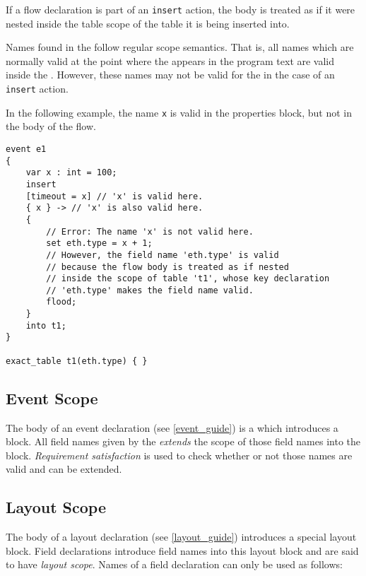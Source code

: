 If a flow declaration is part of an \texttt{insert} action, the body is treated as if it were nested inside the table scope of the table it is being inserted into.

Names found in the  follow regular scope semantics. That is, all names which are normally valid at the point where the  appears in the program text are valid inside the . However, these names may not be valid for the  in the case of an \texttt{insert} action.

In the following example, the name \texttt{x} is valid in the properties block, but not in the body of the flow.

\begin{minip}
\begin{lstlisting}
event e1
{
	var x : int = 100;
	insert
	[timeout = x] // 'x' is valid here.
	{ x } -> // 'x' is also valid here.
	{
		// Error: The name 'x' is not valid here.
		set eth.type = x + 1;
		// However, the field name 'eth.type' is valid
		// because the flow body is treated as if nested
		// inside the scope of table 't1', whose key declaration
		// 'eth.type' makes the field name valid.
		flood;
	}
	into t1;
}

exact_table t1(eth.type) { }
\end{lstlisting}
\end{minip}

\subsection{Event Scope} \label{event_scope}

The body of an event declaration (see \ref{event_guide}) is a  which introduces a block. All field names given by the  \textit{extends} the scope of those field names into the block. \textit{Requirement satisfaction} is used to check whether or not those names are valid and can be extended.

\subsection{Layout Scope} \label{layout_scope}

The body of a layout declaration (see \ref{layout_guide}) introduces a special layout block. Field declarations introduce field names into this layout block and are said to have \textit{layout scope}. Names of a field declaration can only be used as follows:

